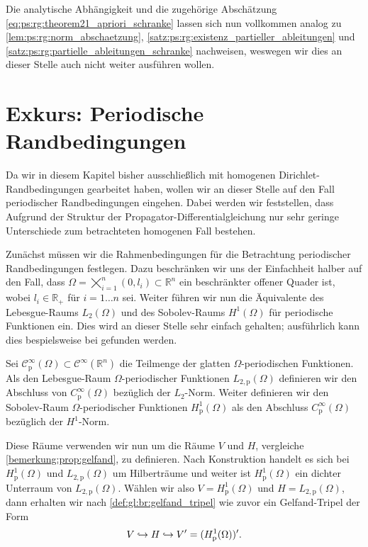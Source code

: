 \begin{Satz}
\begin{Beweis}
        Die analytische Abhängigkeit und die zugehörige Abschätzung \cref{eq:ps:rg:theorem21_apriori_schranke} lassen sich nun vollkommen analog zu \cref{lem:ps:rg:norm_abschaetzung}, \cref{satz:ps:rg:existenz_partieller_ableitungen} und \cref{satz:ps:rg:partielle_ableitungen_schranke} nachweisen, weswegen wir dies an dieser Stelle auch nicht weiter ausführen wollen.
    \end{Beweis}
\end{Satz}

\section{Exkurs: Periodische Randbedingungen} %
\label{sec:ps:pr:periodische_randbedingungen}

Da wir in diesem Kapitel bisher ausschließlich mit homogenen Dirichlet-Randbedingungen gearbeitet haben, wollen wir an dieser Stelle auf den Fall periodischer Randbedingungen eingehen.
Dabei werden wir feststellen, dass Aufgrund der Struktur der Propagator-Differentialgleichung nur sehr geringe Unterschiede zum betrachteten homogenen Fall bestehen.

Zunächst müssen wir die Rahmenbedingungen für die Betrachtung periodischer Randbedingungen festlegen.
Dazu beschränken wir uns der Einfachheit halber auf den Fall, dass $\Omega = \bigtimes_{i = 1}^{n} (0, l_{i}) \subset \mathbb{R}^{n}$ ein beschränkter offener Quader ist, wobei $l_{i} \in \mathbb{R}_{+}$ für $i = 1 \dots n$ sei.
Weiter führen wir nun die Äquivalente des Lebesgue-Raums $L_{2}(\Omega)$ und des Sobolev-Raums $H^{1}(\Omega)$ für periodische Funktionen ein.
Dies wird an dieser Stelle sehr einfach gehalten; ausführlich kann dies bespielsweise bei \cite{??} gefunden werden.

\begin{Definition}
    Sei $\mathcal C_{\text{p}}^{\infty}(\Omega) \subset \mathcal C^{\infty}(\mathbb{R}^{n})$ die Teilmenge der glatten $\Omega$-periodischen Funktionen.
    Als den Lebesgue-Raum $\Omega$-periodischer Funktionen $L_{2,\text{p}}(\Omega)$  definieren wir den Abschluss von $C_{\text{p}}^{\infty}(\Omega)$ bezüglich der $L_{2}$-Norm.
    Weiter definieren wir den Sobolev-Raum $\Omega$-periodischer Funktionen $H^{1}_{\text{p}}(\Omega)$ als den Abschluss $C_{\text{p}}^{\infty}(\Omega)$ bezüglich der $H^{1}$-Norm.
\end{Definition}

Diese Räume verwenden wir nun um die Räume $V$ und $H$, vergleiche \cref{bemerkung:prop:gelfand}, zu definieren.
Nach Konstruktion handelt es sich bei $H^{1}_{\text{p}}(\Omega)$ und $L_{2,\text{p}}(\Omega)$ um Hilberträume und weiter ist $H^{1}_{\text{p}}(\Omega)$ ein dichter Unterraum von $L_{2,\text{p}}(\Omega)$.
Wählen wir also $V = H^{1}_{\text{p}}(\Omega)$ und $H = L_{2,\text{p}}(\Omega)$, dann erhalten wir nach \cref{def:gl:br:gelfand_tripel} wie zuvor ein Gelfand-Tripel der Form
\begin{equation}
    V \hookrightarrow H \hookrightarrow V' = (H^{1}_{\text{p}}(\Omega))'.
\end{equation}

